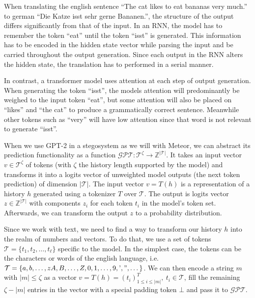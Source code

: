\begin{example}
	When translating the english sentence ``The cat likes to eat bananas very much.'' to german ``Die Katze isst sehr gerne Bananen.'', the structure of the output differs significantly from that of the input.
	In an RNN, the model has to remember the token ``eat'' until the token ``isst'' is generated.
	This information has to be encoded in the hidden state vector while parsing the input and be carried throughout the output generation.
	Since each output in the RNN alters the hidden state, the translation has to performed in a serial manner.
		
	In contrast, a transformer model uses attention at each step of output generation.
	When generating the token ``isst'', the models attention will predominantly be weighed to the input token ``eat'', but some attention will also be placed on ``likes'' and ``the cat'' to produce a grammatically correct sentence.
	Meanwhile other tokens such as ``very'' will have low attention since that word is not relevant to generate ``isst''.
\end{example}



When we use GPT-2 in a stegosystem as we will with Meteor, we can abstract its prediction functionality as a function $\mathcal{GPT} \colon \mathcal{T}^\zeta \rightarrow \mathbb{Z}^{|\mathcal{T}|}$.
It takes an input vector $v \in \mathcal{T}^\zeta$ of tokens (with $\zeta$ the history length supported by the model) and transforms it into a logits vector of unweighted model outputs (the next token prediction) of dimension $|\mathcal{T}|$.
The input vector $v=T(h)$ is a representation of a history $h$ generated using a tokenizer $T$ over $\mathcal{T}$.
The output is logits vector $z \in \mathbb{Z}^{|\mathcal{T}|}$ with components $z_i$ for each token $t_i$ in the model's token set.
Afterwards, we can transform the output $z$ to a probability distribution.

Since we work with text, we need to find a way to transform our history $h$ into the realm of numbers and vectors.
To do that, we use a set of tokens $\mathcal{T} = \{ t_1, t_2, \dots, t_\ell \}$ specific to the model.
In the simplest case, the tokens can be the characters or words of the english language, i.e. $\mathcal{T} = \{ a, b, \dots, z A, B, \dots, Z, 0, 1, \dots, 9, \textrm{'}, ", \dots \}$.
We can then encode a string $m$ with $|m| \leq \zeta$ as a vector $v = T(h) = \left(t_i\right)^T_{1 \leq i \leq |m|}, ~t_i \in \mathcal{T}$, fill the remaining $\zeta - |m|$ entries in the vector with a special padding token $\bot$ and pass it to $\mathcal{GPT}$.
	

